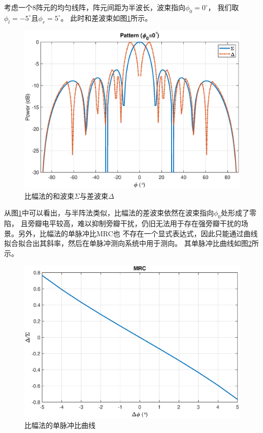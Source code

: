 \documentclass[master]{thesis-uestc}
\begin{document}
考虑一个$8$阵元的均匀线阵，阵元间距为半波长，波束指向$\phi_0=0^\circ$，
我们取$\phi_l=-5^\circ$且$\phi_r=5^\circ$。
此时和差波束如图\ref{ACM_sigma_delta}所示。
\begin{figure}[h]
    \includegraphics[scale=0.4]{pic/ACM_sigma_delta.eps}
    \caption{比幅法的和波束$\Sigma$与差波束$\Delta$}
    \label{ACM_sigma_delta}
\end{figure}

从图\ref{ACM_sigma_delta}中可以看出，与半阵法类似，比幅法的差波束依然在波束指向$\phi_0$处形成了零陷，
且旁瓣电平较高，难以抑制旁瓣干扰，仍旧无法用于存在强旁瓣干扰的场景。另外，比幅法的单脉冲比MRC也
不存在一个显式表达式，因此只能通过曲线拟合拟合出其斜率，然后在单脉冲测向系统中用于测向。
其单脉冲比曲线如图\ref{ACM_MRC_figure}所示。
\begin{figure}[h]
    \includegraphics[scale=0.4]{pic/ACM_MRC.eps}
    \caption{比幅法的单脉冲比曲线}
    \label{ACM_MRC_figure}
\end{figure}
\end{document}
